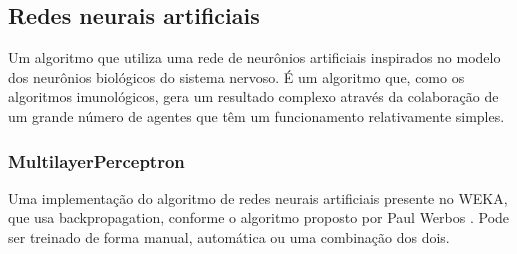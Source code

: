 \subsection{Redes neurais artificiais}

Um algoritmo que utiliza uma rede de neurônios artificiais inspirados no modelo dos neurônios biológicos do sistema nervoso. É um algoritmo que, como os algoritmos imunológicos, gera um resultado complexo através da colaboração de um grande número de agentes que têm um funcionamento relativamente simples.

\subsubsection{MultilayerPerceptron}

Uma implementação do algoritmo de redes neurais artificiais presente no WEKA, que usa backpropagation, conforme o algoritmo proposto por Paul Werbos \cite{Werbos1974}. Pode ser treinado de forma manual, automática ou uma combinação dos dois.

